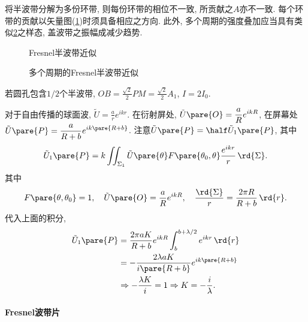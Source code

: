 \documentclass{ctexart}
\begin{document}
将半波带分解为多份环带, 则每份环带的相位不一致, 所贡献之$A$亦不一致. 每个环带的贡献以矢量图(\cref{fig:Fresnel半波带近似})时须具备相应之方向. 此外, 多个周期的强度叠加应当具有类似\cref{fig:多个周期的Fresnel半波带近似}之样态, 盖波带之振幅成减少趋势.
\begin{figure}[ht]
    \centering
    \caption{Fresnel半波带近似}
    \label{fig:Fresnel半波带近似}
\end{figure}
\begin{figure}[ht]
    \centering
    \caption{多个周期的Fresnel半波带近似}
    \label{fig:多个周期的Fresnel半波带近似}
\end{figure}
\begin{sample}
    \begin{ex}
        若圆孔包含$1/2$个半波带, $OB = \displaystyle \frac{\sqrt{2}}{2}PM = \frac{\sqrt{2}}{2}A_1$, $I = 2I_0$.
    \end{ex}
\end{sample}
\begin{sample}
    \begin{ex}
        对于自由传播的球面波, $\displaystyle \tilde{U} = \frac{a}{r}e^{ikr}$. 在衍射屏处, $\tilde{U}\pare{O} = \displaystyle \frac{a}{R}e^{ikR}$, 在屏幕处$\displaystyle \tilde{U}\pare{P} = \frac{a}{R+b}e^{ik\pare{R+b}}$. 注意$\tilde{U}\pare{P} = \displaystyle \half \tilde{U}_1\pare{P}$, 其中
        \[ \tilde{U}_1\pare{P} = k\iint_{\Sigma_1} \tilde{U}\pare{\theta}F\pare{\theta_0,\theta} \frac{e^{ikr}}{r}\,\rd{\Sigma}. \]
        其中
        \[ F\pare{\theta,\theta_0} = 1,\quad \tilde{U}\pare{O} = \frac{a}{R}e^{ikR},\quad \frac{\rd{\Sigma}}{r} = \frac{2\pi R}{R+b}\,\rd{r}. \]
        代入上面的积分,
        \begin{align*}
            \tilde{U}_1\pare{P} &= \frac{2\pi aK}{R+b} e^{ikR} \int_b^{b+\lambda/2} e^{ikr}\,\rd{r} \\
            &= -\frac{2\lambda aK}{i\pare{R+b}} e^{ik\pare{R+b}} \\
            &\Rightarrow -\frac{\lambda K}{i} = 1 \Rightarrow K = -\frac{i}{\lambda}.
        \end{align*}
    \end{ex}
\end{sample}


\paragraph{Fresnel波带片} %
\label{par:fresnel波带片}
\end{document}
